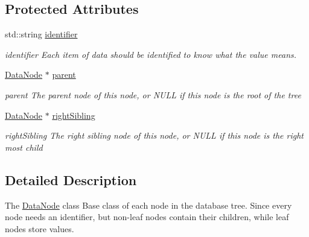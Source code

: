 \subsection*{Protected Attributes}
\begin{DoxyCompactItemize}
\item 
std\+::string \hyperlink{classDatabase_1_1DataNode_ace59a7fba9c490d2dae59c4af7b0c71f}{identifier}\hypertarget{classDatabase_1_1DataNode_ace59a7fba9c490d2dae59c4af7b0c71f}{}\label{classDatabase_1_1DataNode_ace59a7fba9c490d2dae59c4af7b0c71f}

\begin{DoxyCompactList}\small\item\em identifier Each item of data should be identified to know what the value means. \end{DoxyCompactList}\item 
\hyperlink{classDatabase_1_1DataNode}{Data\+Node} $\ast$ \hyperlink{classDatabase_1_1DataNode_a8d70472d0f14aa3ae3ee74d9f3e879d6}{parent}\hypertarget{classDatabase_1_1DataNode_a8d70472d0f14aa3ae3ee74d9f3e879d6}{}\label{classDatabase_1_1DataNode_a8d70472d0f14aa3ae3ee74d9f3e879d6}

\begin{DoxyCompactList}\small\item\em parent The parent node of this node, or N\+U\+LL if this node is the root of the tree \end{DoxyCompactList}\item 
\hyperlink{classDatabase_1_1DataNode}{Data\+Node} $\ast$ \hyperlink{classDatabase_1_1DataNode_ae335fc33c3813e8a6638d50faef44d5d}{right\+Sibling}\hypertarget{classDatabase_1_1DataNode_ae335fc33c3813e8a6638d50faef44d5d}{}\label{classDatabase_1_1DataNode_ae335fc33c3813e8a6638d50faef44d5d}

\begin{DoxyCompactList}\small\item\em right\+Sibling The right sibling node of this node, or N\+U\+LL if this node is the right most child \end{DoxyCompactList}\end{DoxyCompactItemize}


\subsection{Detailed Description}
The \hyperlink{classDatabase_1_1DataNode}{Data\+Node} class Base class of each node in the database tree. Since every node needs an identifier, but non-\/leaf nodes contain their children, while leaf nodes store values. 

